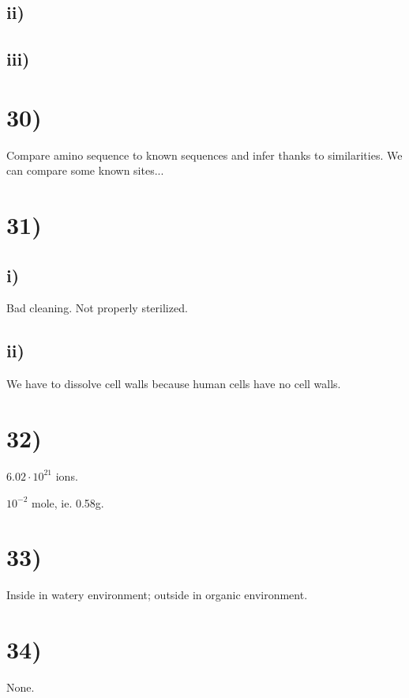     \subsection*{ii)}

    \subsection*{iii)}


\section*{30)}

Compare amino sequence to known sequences and infer thanks to similarities. We can compare some known sites...

\section*{31)}
    \subsection*{i)}

Bad cleaning. Not properly sterilized.

    \subsection*{ii)}
    
We have to dissolve cell walls because human cells have no cell walls.

\section*{32)}

$6.02\cdot 10^{21}$ ions.

$10^{-2}$ mole, ie. 0.58g.

\section*{33)}

Inside in watery environment; outside in organic environment.

\section*{34)}

None.







